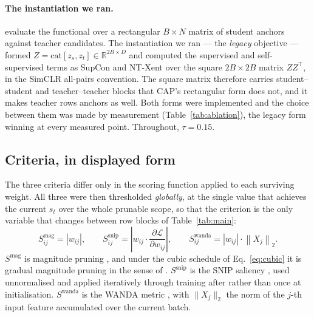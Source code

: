 \paragraph{The instantiation we ran.}
\citet{xu2022cap} evaluate the functional over a rectangular $B \times N$ matrix
of student anchors against teacher candidates. The instantiation we ran --- the
\emph{legacy} objective --- formed
$Z = \mathrm{cat}[z_s, z_t] \in \mathbb{R}^{2B \times D}$ and computed the
supervised and self-supervised terms as SupCon \citep{khosla2020supcon} and
NT-Xent \citep{chen2020simclr} over the square $2B \times 2B$ matrix $ZZ^{\top}$,
in the SimCLR all-pairs convention. The square matrix therefore carries
student--student and teacher--teacher blocks that CAP's rectangular form does
not, and it makes teacher rows anchors as well. Both forms were implemented and
the choice between them was made by measurement (Table~\ref{tab:ablation}), the
legacy form winning at every measured point. Throughout, $\tau = 0.15$.

\subsection{Criteria, in displayed form}

The three criteria differ only in the scoring function applied to each surviving
weight. All three were then thresholded \emph{globally}, at the single value that
achieves the current $s_t$ over the whole prunable scope, so that the criterion
is the only variable that changes between row blocks of Table~\ref{tab:main}:
%
\begin{equation}
\label{eq:criteria}
S^{\mathrm{mag}}_{ij} = \left| w_{ij} \right| ,
\qquad
S^{\mathrm{snip}}_{ij} = \left| w_{ij} \cdot \frac{\partial \mathcal{L}}{\partial w_{ij}} \right| ,
\qquad
S^{\mathrm{wanda}}_{ij} = \left| w_{ij} \right| \cdot \left\lVert X_j \right\rVert_2 .
\end{equation}
%
$S^{\mathrm{mag}}$ is magnitude pruning \citep{han2015learning}, and under the
cubic schedule of Eq.~\eqref{eq:cubic} it is gradual magnitude pruning in the
sense of \citet{zhu2018prune}. $S^{\mathrm{snip}}$ is the SNIP saliency
\citep{lee2019snip}, used unnormalised and applied iteratively through training
after \citet{verdenius2020snipit} rather than once at initialisation.
$S^{\mathrm{wanda}}$ is the WANDA metric \citep{sun2024wanda}, with
$\lVert X_j \rVert_2$ the norm of the $j$-th input feature accumulated over the
current batch.

